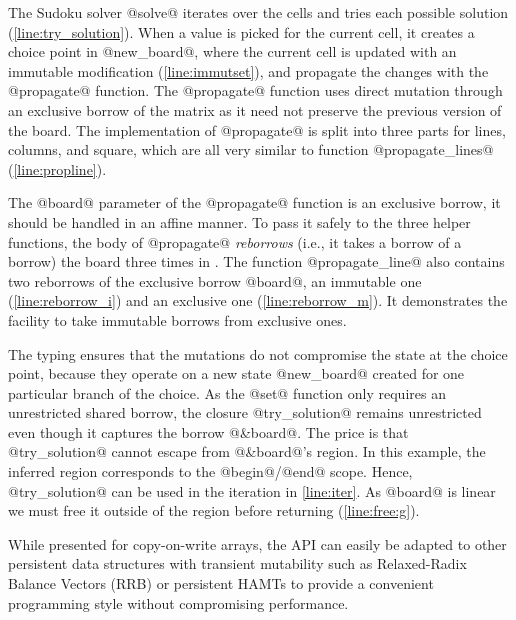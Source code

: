 The Sudoku solver @solve@ iterates over the cells and tries each possible
solution (\cref{line:try_solution}). 
When a value is picked for the current cell, it creates a choice point
in @new_board@, where the current cell is updated with an immutable modification (\cref{line:immutset}), and propagate
the changes with the @propagate@ function.
The @propagate@ function uses direct mutation through an
exclusive borrow of the matrix as it need not preserve the previous
version of the board.
The implementation of @propagate@ is split into three parts
for lines, columns, and square, which are all very similar to function
@propagate_lines@ (\cref{line:propline}).

The @board@ parameter of the @propagate@ function is an exclusive
borrow, it should be handled 
in an affine manner. To pass it safely to the three helper functions,
the body of @propagate@ \emph{reborrows} (i.e., it takes a borrow of a
borrow) the board three times in 
.
The function @propagate_line@ also contains two reborrows of the
exclusive borrow @board@, an
immutable one (\cref{line:reborrow_i}) and an exclusive one
(\cref{line:reborrow_m}). It demonstrates the facility 
to take immutable borrows from exclusive ones.

The typing ensures that the mutations do not compromise the state at
the choice point, because they operate on a new state @new_board@ created for one
particular branch of the choice.
As the @set@ function only requires an unrestricted shared borrow,
the closure @try_solution@ remains unrestricted even though
it captures the borrow @&board@.
The price is that @try_solution@ cannot escape from
@&board@'s region. In this example, the inferred region corresponds to the
@begin@/@end@ scope. 
Hence, @try_solution@ can be used in
the iteration in \cref{line:iter}.
As @board@ is linear we must free it outside of the region
before returning (\cref{line:free:g}).

While presented for copy-on-write arrays, the API
can easily be adapted to other persistent data structures with
transient mutability such as Relaxed-Radix Balance Vectors (RRB) \cite{DBLP:journals/pacmpl/Puente17}
or persistent HAMTs \cite{bagwell2001ideal,clojurehamt} to provide  a
convenient programming style without compromising performance.


